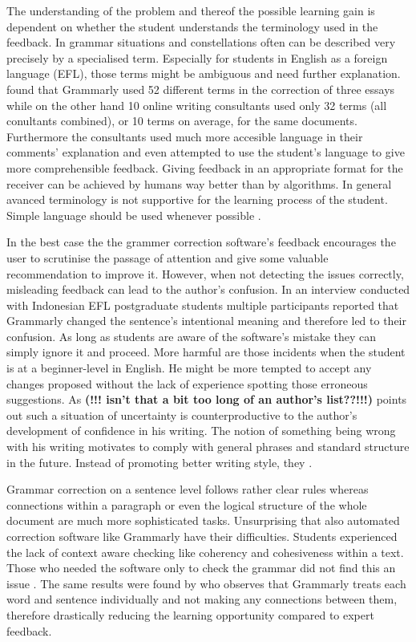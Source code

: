 \documentclass[runningheads]{llncs}
\begin{document}
The understanding of the problem and thereof the possible learning gain is dependent on whether the student understands the terminology used in the feedback. In grammar situations and constellations often can be described very precisely by a specialised term. Especially for students in English as a foreign language (EFL), those terms might be ambiguous and need further explanation. \textcite{dembsey_closing_2017} found that Grammarly used 52 different terms in the correction of three essays while on the other hand 10 online writing consultants used only 32 terms (all conultants combined), or 10 terms on average, for the same documents. Furthermore the consultants used much more accesible language in their comments' explanation and even attempted to use the student's language to give more comprehensible feedback. Giving feedback in an appropriate format for the receiver can be achieved by humans way better than by algorithms. In general avanced terminology is not supportive for the learning process of the student. Simple language should be used whenever possible \citep{dembsey_closing_2017}.

In the best case the the grammer correction software's feedback encourages the user to scrutinise the passage of attention and give some valuable recommendation to improve it. However, when not detecting the issues correctly, misleading feedback can lead to the author's confusion. In an interview conducted with Indonesian EFL postgraduate students \citep{nova_utilizing_2018} multiple participants reported that Grammarly changed the sentence's intentional meaning and therefore led to their confusion. As long as students are aware of the software's mistake they can simply ignore it and proceed. More harmful are those incidents when the student is at a beginner-level in English. He might be more tempted to accept any changes proposed without the lack of experience spotting those erroneous suggestions. As \textcite{vojak_new_2011} \textbf{(!!! isn't that a bit too long of an author's list??!!!)} points out such a situation of uncertainty is counterproductive to the author's development of confidence in his writing. The notion of something being wrong with his writing motivates to comply with general phrases and standard structure in the future. Instead of promoting better writing style, they . 

Grammar correction on a sentence level follows rather clear rules whereas connections within a paragraph or even the logical structure of the whole document are much more sophisticated tasks. Unsurprising that also automated correction software like Grammarly have their difficulties. Students experienced the lack of context aware checking like coherency and cohesiveness within a text. Those who needed the software only to check the grammar did not find this an issue \citep{nova_utilizing_2018}. The same results were found by \textcite{dembsey_closing_2017} who observes that Grammarly treats each word and sentence individually and not making any connections between them, therefore drastically reducing the learning opportunity compared to expert feedback.
\end{document}
